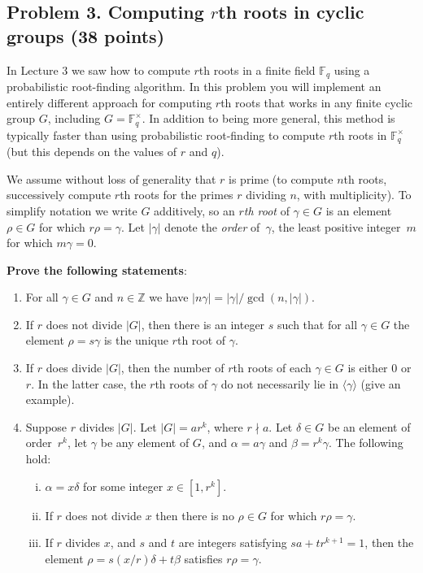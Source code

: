 \documentclass[11pt]{article}
\newcommand{\Fq}{\mathbb{F}_q}
\newcommand{\Z}{\mathbb{Z}}
\begin{document}
\subsection*{Problem 3. Computing $r$th roots in cyclic groups (38 points)}
In Lecture 3 we saw how to compute $r$th roots in a finite field $\Fq$ using a probabilistic root-finding algorithm.
In this problem you will implement an entirely different approach for computing $r$th roots that works in any finite cyclic group $G$, including $G=\Fq^\times$.
In addition to being more general, this method is typically faster than using probabilistic root-finding to compute $r$th roots in $\Fq^\times$ (but this depends on the values of $r$ and  $q$).

We assume without loss of generality that $r$ is prime (to compute $n$th roots, successively compute $r$th roots for the primes $r$ dividing $n$, with multiplicity).
To simplify notation we write $G$ additively, so an \emph{$r$th root} of $\gamma\in G$ is an element $\rho\in G$ for which $r\rho=\gamma$.
Let $|\gamma|$ denote the \emph{order} of~$\gamma$, the least positive integer~$m$ for which $m\gamma=0$.

\medskip
\noindent
\textbf{Prove the following statements}:
\begin{enumerate}[{\bf (a)}]
\item For all $\gamma\in G$ and $n\in\Z$ we have $|n\gamma| = |\gamma| / \gcd(n,|\gamma|)$.
\item If $r$ does not divide $|G|$, then there is an integer $s$ such that for all $\gamma\in G$ the element $\rho = s\gamma$ is the unique $r$th root of $\gamma$.
\item  If $r$ does divide $|G|$, then the number of $r$th roots of each $\gamma\in G$ is either 0 or $r$.
In the latter case, the $r$th roots of $\gamma$ do not necessarily lie in $\langle \gamma\rangle$ (give an example).
\item Suppose $r$ divides $|G|$.  Let $|G|=ar^k$, where $r\nmid a$.  Let $\delta\in G$ be an element of order~$r^k$, let $\gamma$ be any element of $G$, and $\alpha=a\gamma$ and $\beta=r^k\gamma$.  The following hold:

\begin{enumerate}[(i)]
\setlength{\itemsep}{0pt}
\item $\alpha = x\delta$ for some integer $x\in[1,r^k]$.
\item If $r$ does not divide $x$ then there is no $\rho\in G$ for which $r\rho = \gamma$.
\item If $r$ divides $x$, and $s$ and $t$ are integers satisfying $sa+tr^{k+1}=1$,
then the element $\rho = s(x/r)\delta + t\beta$ satisfies $r\rho = \gamma$.
\end{enumerate}
\end{enumerate}
\vspace{-4pt}
\end{document}
